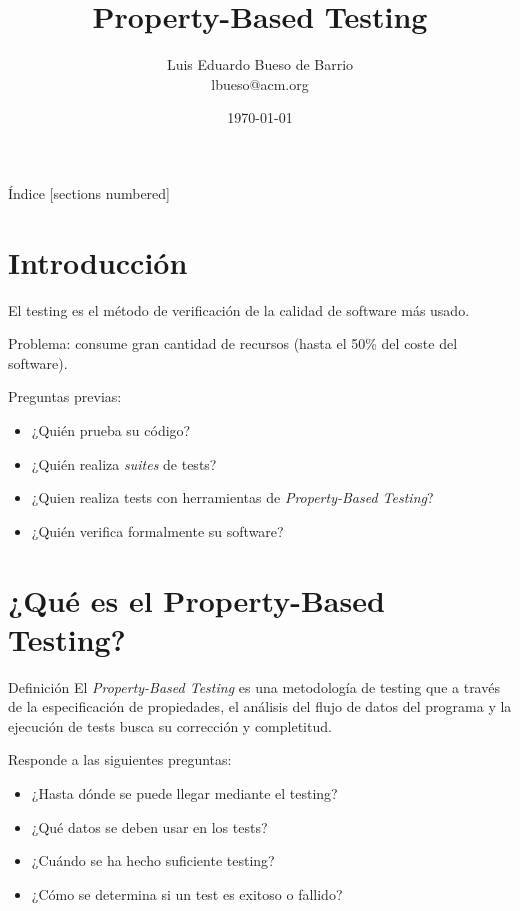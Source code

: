 \documentclass[10pt]{beamer}
\title{Property-Based Testing}
\date{\today}
\author{
  Luis Eduardo Bueso de Barrio\\
  lbueso@acm.org
}
\institute{ACM PLIG}
\begin{document}
\nocite{*}

\maketitle

\begin{frame}{Índice}
  [sections numbered]
  \tableofcontents[hideallsubsections]
\end{frame}

\section{Introducción}

\begin{frame}                   %
  El testing es el método de verificación de la calidad de software
  más usado.

  Problema: consume gran cantidad de recursos (hasta el 50\% del coste
  del software).

  Preguntas previas:
  \begin{itemize}
  \item ¿Quién prueba su código?
  \item ¿Quién realiza \textit{suites} de tests?
  \item ¿Quien realiza tests con herramientas de \textit{Property-Based Testing}?
  \item ¿Quién verifica formalmente su software?
  \end{itemize}
\end{frame}

\section{¿Qué es el Property-Based Testing?}

\begin{frame}{Definición}
  El \textit{Property-Based Testing} es una metodología de testing que
  a través de la especificación de propiedades, el análisis del flujo
  de datos del programa y la ejecución de tests busca su corrección y
  completitud.

  Responde a las siguientes preguntas:
  \begin{itemize}
  \item ¿Hasta dónde se puede llegar mediante el testing?
  \item ¿Qué datos se deben usar en los tests?
  \item ¿Cuándo se ha hecho suficiente testing?
  \item ¿Cómo se determina si un test es exitoso o fallido?
  \end{itemize}

\end{frame}
\end{document}

